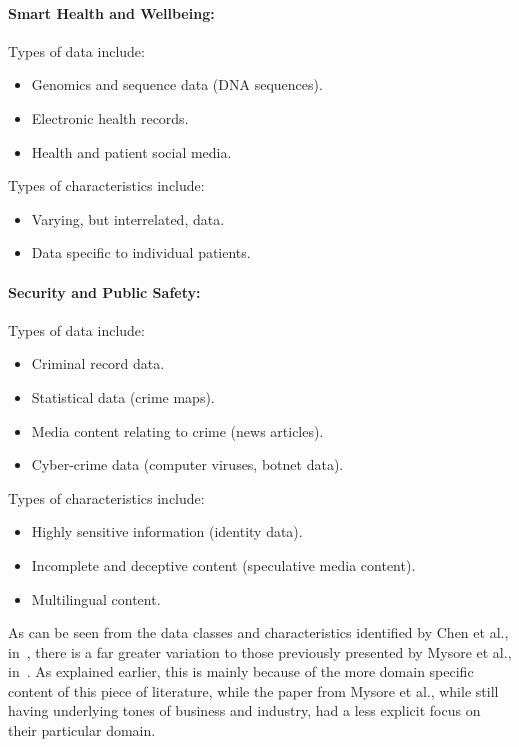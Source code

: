 \documentclass[a4paper,11pt]{article}
\begin{document}
\paragraph{Smart Health and Wellbeing:\\}

Types of data include:

\begin{itemize}
  \item Genomics and sequence data (DNA sequences).
  \item Electronic health records.
  \item Health and patient social media.
\end{itemize}

Types of characteristics include:

\begin{itemize}
  \item Varying, but interrelated, data.
  \item Data specific to individual patients.
\end{itemize}


\paragraph{Security and Public Safety:\\}

Types of data include:

\begin{itemize}
  \item Criminal record data.
  \item Statistical data (crime maps).
  \item Media content relating to crime (news articles).
  \item Cyber-crime data (computer viruses, botnet data).
\end{itemize}

Types of characteristics include:

\begin{itemize}
  \item Highly sensitive information (identity data).
  \item Incomplete and deceptive content (speculative media content).
  \item Multilingual content.
\end{itemize}

As can be seen from the data classes and characteristics identified by Chen et al., in~\cite{chen2012business}, there is
a far greater variation to those previously presented by Mysore et al., in~\cite{bifet_mining_2013}. As explained earlier,
this is mainly because of the more domain specific content of this piece of literature, while the paper from Mysore et
al., while still having underlying tones of business and industry, had a less explicit focus on their particular domain.
\end{document}
